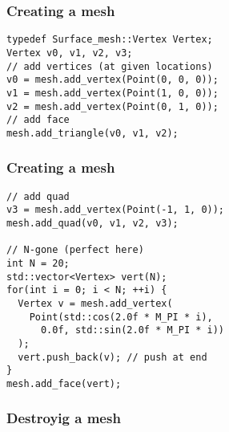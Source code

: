 
\begin{frame}
\end{frame}

%

\begin{frame}[fragile]
\frametitle{Creating a mesh}
\begin{lstlisting}
typedef Surface_mesh::Vertex Vertex;
Vertex v0, v1, v2, v3;
// add vertices (at given locations)
v0 = mesh.add_vertex(Point(0, 0, 0));
v1 = mesh.add_vertex(Point(1, 0, 0));
v2 = mesh.add_vertex(Point(0, 1, 0));
// add face
mesh.add_triangle(v0, v1, v2);
\end{lstlisting}
\end{frame}

\begin{frame}[fragile]
\frametitle{Creating a mesh}
\begin{lstlisting}[firstnumber=9]
// add quad
v3 = mesh.add_vertex(Point(-1, 1, 0));
mesh.add_quad(v0, v1, v2, v3);

// N-gone (perfect here)
int N = 20;
std::vector<Vertex> vert(N);
for(int i = 0; i < N; ++i) {
  Vertex v = mesh.add_vertex(
    Point(std::cos(2.0f * M_PI * i),
      0.0f, std::sin(2.0f * M_PI * i)) 
  );
  vert.push_back(v); // push at end
}
mesh.add_face(vert);
\end{lstlisting}
\end{frame}

\begin{frame}
\frametitle{Destroyig a mesh}
\end{frame}

